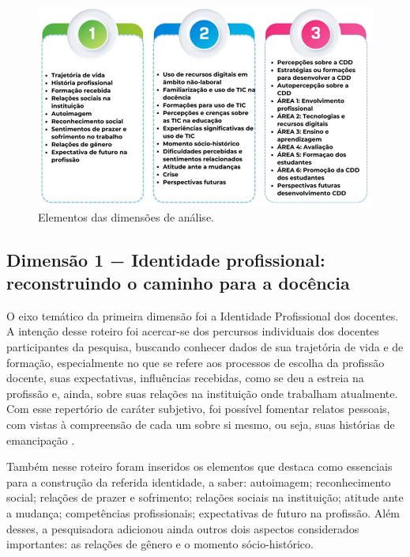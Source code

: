 \documentclass[portuguese]{textolivre}
\begin{document}
\begin{figure}
    \centering
    \begin{minipage}{.75\textwidth}
    \includegraphics[width=\linewidth]{Figura2.png}
    \caption{Elementos das dimensões de análise.}
    \label{fig2}
    \end{minipage}
\end{figure}

\subsection{Dimensão 1 − Identidade profissional: reconstruindo o caminho para a docência }\label{sec-formato}
O eixo temático da primeira dimensão foi a Identidade Profissional dos docentes. A intenção desse roteiro foi acercar-se dos percursos individuais dos docentes participantes da pesquisa, buscando conhecer dados de sua trajetória de vida e de formação, especialmente no que se refere aos processos de escolha da profissão docente, suas expectativas, influências recebidas, como se deu a estreia na profissão e, ainda, sobre suas relações na instituição onde trabalham atualmente. Com esse repertório de caráter subjetivo, foi possível fomentar relatos pessoais, com vistas à compreensão de cada um sobre si mesmo, ou seja, suas histórias de emancipação \cite{rivas2011}.

Também nesse roteiro foram inseridos os elementos que \textcite{bolivar2006} destaca como essenciais para a construção da referida identidade, a saber: autoimagem; reconhecimento social; relações de prazer e sofrimento; relações sociais na instituição; atitude ante a mudança; competências profissionais; expectativas de futuro na profissão. Além desses, a pesquisadora adicionou ainda outros dois aspectos considerados importantes: as relações de gênero e o momento sócio-histórico. 
\end{document}
